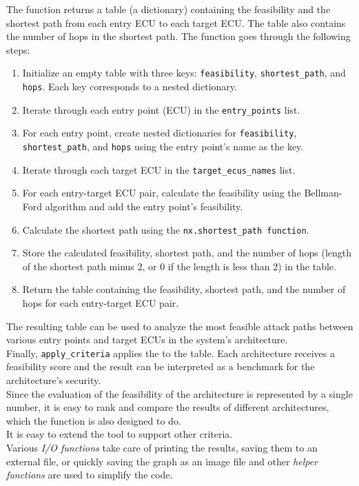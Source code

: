 The function returns a table (a dictionary) containing the feasibility and the shortest path from each entry ECU to each target ECU. 
The table also contains the number of hops in the shortest path.
The function goes through the following steps:

\begin{enumerate}
    \item Initialize an empty table with three keys: \texttt{feasibility}, \texttt{shortest\_path}, and \texttt{hops}. 
        Each key corresponds to a nested dictionary.
    \item Iterate through each entry point (ECU) in the \texttt{entry\_points} list.
    \item For each entry point, create nested dictionaries for \texttt{feasibility}, \texttt{shortest\_path}, and \texttt{hops} using the entry point's name as the key.
    \item Iterate through each target ECU in the \texttt{target\_ecus\_names} list.
    \item For each entry-target ECU pair, calculate the feasibility using the Bellman-Ford algorithm and add the entry point's feasibility.
    \item Calculate the shortest path using the \texttt{nx.shortest\_path function}.
    \item Store the calculated feasibility, shortest path, and the number of hops (length of the shortest path minus 2, or 0 if the length is less than 2) in the table.
    \item Return the table containing the feasibility, shortest path, and the number of hops for each entry-target ECU pair.
\end{enumerate}

The resulting table can be used to analyze the most feasible attack paths between various entry points and target ECUs in the system's architecture.\\


Finally, \texttt{apply\_criteria} applies the  to the table.
Each architecture receives a feasibility score and the result can be interpreted as a benchmark for the architecture's security.\\
Since the evaluation of the feasibility of the architecture is represented by a single number, 
it is easy to rank and compare the results of different architectures, which the function is also designed to do.\\

It is easy to extend the tool to support other criteria.\\

Various \textit{I/O functions} take care of printing the results, saving them to an external file, or quickly saving the graph as an image file
and other \textit{helper functions} are used to simplify the code.
